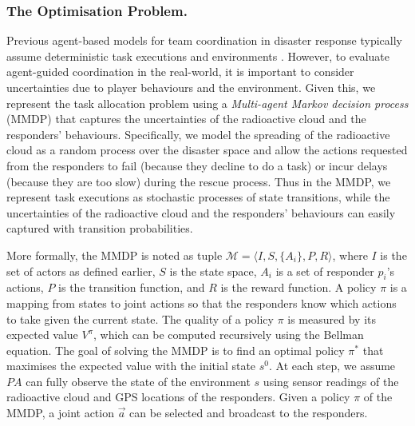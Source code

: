 \subsubsection{The Optimisation Problem.}
\label{sec:model}
Previous agent-based models for team coordination in disaster
response typically assume deterministic task executions and
environments \cite{ramchurn:etal:2010,Scerri2005}. However, to evaluate agent-guided coordination in the real-world, it is important to consider uncertainties due to
player behaviours and the environment. Given this, we represent the
task allocation problem using a {\em Multi-agent Markov decision
process} (MMDP) that captures the uncertainties of the radioactive
cloud and the responders' behaviours. Specifically, we model
the spreading of the radioactive cloud as a random process over the
disaster space and allow the actions requested from the responders
to  fail (because they decline to do a  task) or incur delays
(because they are too slow) during the rescue process. Thus in the
MMDP, we represent  task executions as stochastic processes
of state transitions, while the uncertainties of the radioactive
cloud and the responders' behaviours can easily captured with
transition probabilities.

More formally, the MMDP is noted as tuple $\mathcal{M} =
\langle I, S, \{A_i\}, P, R \rangle$, where $I$ is the set of
actors as defined earlier,  $S$ is the state space,
$A_i$ is a set of responder $p_i$'s actions, $P$ is the transition
function, and $R$ is the reward function. A policy $\pi$ is a
mapping from states to joint actions so that the responders know
which actions to take given the current state. The quality of a
policy $\pi$ is measured by its expected value $V^\pi$, which can
be computed recursively using the Bellman equation. The goal of
solving the MMDP is to find an optimal policy $\pi^*$ that
maximises the expected value with the initial state $s^0$. At each
step, we assume $PA$ can fully observe the
state of the environment $s$ using sensor readings of the
radioactive cloud and GPS locations of the responders. Given a
policy $\pi$ of the MMDP, a joint action $\vec{a}$ can be selected
and broadcast to the responders.
